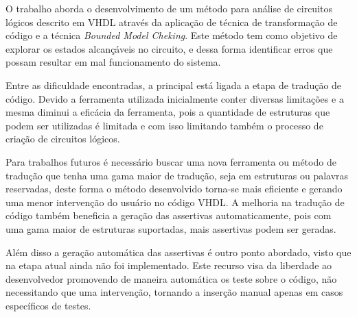 \label{chapter:consideracoes}
O trabalho aborda o desenvolvimento de um método para análise de circuitos lógicos descrito em VHDL através da aplicação de técnica de transformação de código e a técnica \textit{Bounded Model Cheking}. Este método tem como objetivo de explorar os estados alcançáveis no circuito, e dessa forma identificar erros que possam resultar em mal funcionamento do sistema.

\par
Entre as dificuldade encontradas, a principal está ligada a etapa de tradução de código. Devido a ferramenta utilizada inicialmente conter diversas limitações e  a mesma diminui a eficácia da ferramenta, pois a quantidade de estruturas que podem ser utilizadas é limitada e com isso limitando também o processo de criação de circuitos lógicos.

\par
Para trabalhos futuros é necessário buscar uma nova ferramenta ou método de tradução que tenha uma gama maior de tradução, seja em estruturas ou palavras reservadas, deste forma o método desenvolvido torna-se mais eficiente e gerando uma menor intervenção do usuário no código VHDL. A melhoria na tradução de código também beneficia a geração das assertivas automaticamente, pois com uma gama maior de estruturas suportadas, mais assertivas podem ser geradas.

\par
Além disso a geração automática das assertivas é outro ponto abordado, visto que na etapa atual ainda não foi implementado. Este recurso visa da liberdade ao desenvolvedor promovendo de maneira automática os teste sobre o código, não necessitando que uma intervenção, tornando a inserção manual apenas em casos específicos de testes.

 